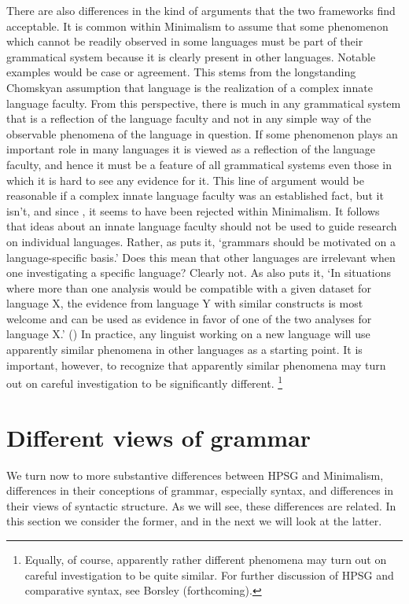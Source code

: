 \documentclass[output=paper]{langsci/langscibook}
\begin{document}
There are also differences in the kind of arguments that the two frameworks find acceptable. It is common within Minimalism to assume that some phenomenon which cannot be readily observed in some languages must be part of their grammatical system because it is clearly present in other languages. Notable examples would be case or agreement. This stems from the longstanding Chomskyan assumption that language is the realization of a complex innate language faculty. From this perspective, there is much in any grammatical system that is a reflection of the language faculty and not in any simple way of the observable phenomena of the language in question. If some phenomenon plays an important role in many languages it is viewed as a reflection of the language faculty, and hence it must be a feature of all grammatical systems even those in which it is hard to see any evidence for it. This line of argument would be reasonable if a complex innate language faculty was an established fact, but it isn't, and since \citet{HCF2002a}, it seems to have been rejected within Minimalism.  It follows that ideas about an innate language faculty should not be used to guide research on individual languages. Rather, as \citet[25]{MuellerCoreGram} puts it, `grammars should be motivated on a language-specific basis.' Does this mean that other languages are irrelevant when one investigating a specific language? Clearly not. As  also puts it, `In situations where more than one analysis would be compatible with a given dataset for language X, the evidence from language Y with similar constructs is most welcome and can be used as evidence in favor of one of the two analyses for language X.' (\citeyear[43]{MuellerCoreGram}) In practice, any linguist working on a new language will use apparently similar phenomena in other languages as a starting point. It is important, however, to recognize that apparently similar phenomena may turn out on careful investigation to be significantly different.%
	\footnote{Equally, of course, apparently rather different phenomena may turn out on careful investigation to be quite similar. For further discussion of HPSG and comparative syntax, see Borsley (forthcoming).}
\section{Different views of grammar}
\label{sec:min-views-grammar}
We turn now to more substantive differences between HPSG and Minimalism, differences in their conceptions of grammar, especially syntax, and differences in their views of syntactic structure. As we will see, these differences are related. In this section we consider the former, and in the next we will look at the latter.
\end{document}
